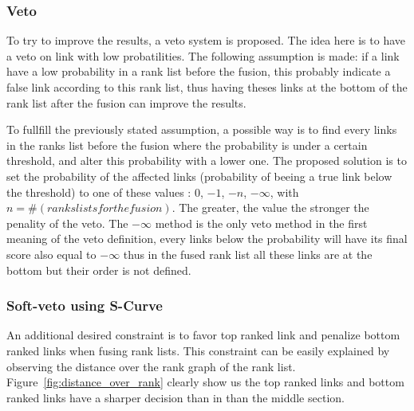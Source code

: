 \subsubsection{Veto}

To try to improve the results, a veto system is proposed.
The idea here is to have a veto on link with low probatilities.
The following assumption is made: if a link have a low probability in a rank list before the fusion, this probably indicate a false link according to this rank list, thus having theses links at the bottom of the rank list after the fusion can improve the results.

To fullfill the previously stated assumption, a possible way is to find every links in the ranks list before the fusion where the probability is under a certain threshold, and alter this probability with a lower one.
The proposed solution is to set the probability of the affected links (probability of beeing a true link below the threshold) to one of these values : $0$, $-1$, $-n$, $-\infty$, with $n = \#(ranks lists for the fusion)$.
The greater, the value the stronger the penality of the veto.
The $-\infty$ method is the only veto method in the first meaning of the veto definition, every links below the probability will have its final score also equal to $-\infty$ thus in the fused rank list all these links are at the bottom but their order is not defined.

\subsubsection{Soft-veto using S-Curve}

An additional desired constraint is to favor top ranked link and penalize bottom ranked links when fusing rank lists.
This constraint can be easily explained by observing the distance over the rank graph of the rank list.
Figure~\ref{fig:distance_over_rank} clearly show us the top ranked links and bottom ranked links have a sharper decision than in than the middle section.

